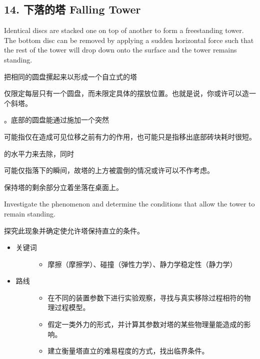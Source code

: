 \documentclass[a4paper,10pt,english]{sphinxmanual}
\begin{document}
\subsection{14. 下落的塔 Falling Tower}
\label{\detokenize{8. Appendix:falling-tower}}
Identical discs are stacked one on top of another to form a freestanding tower. The bottom disc can be removed by applying a sudden horizontal force such that the rest of the tower will drop down onto the surface and the tower remains standing.

把相同的圆盘摞起来以形成一个自立式的塔 %
\begin{footnote}[9]\sphinxAtStartFootnote
仅限定每层只有一个圆盘，而未限定具体的摆放位置。也就是说，你或许可以造一个斜塔。
%
\end{footnote} 。底部的圆盘能通过施加一个突然 %
\begin{footnote}[10]\sphinxAtStartFootnote
可能指仅在造成可见位移之前有力的作用，也可能只是指移出底部砖块耗时很短。
%
\end{footnote} 的水平力来去除，同时 %
\begin{footnote}[11]\sphinxAtStartFootnote
可能仅指落下的瞬间，故塔的上方被震倒的情况或许可以不作考虑。
%
\end{footnote} 保持塔的剩余部分立着坐落在桌面上。

Investigate the phenomenon and determine the conditions that allow the tower to remain standing.

探究此现象并确定使允许塔保持直立的条件。
\begin{itemize}
\item {} \begin{description}
\item[{关键词}] \leavevmode\begin{itemize}
\item {} 
摩擦（摩擦学）、碰撞（弹性力学）、静力学稳定性（静力学）

\end{itemize}

\end{description}

\item {} \begin{description}
\item[{路线}] \leavevmode\begin{itemize}
\item {} 
在不同的装置参数下进行实验观察，寻找与真实移除过程相符的物理过程模型。

\item {} 
假定一类外力的形式，并计算其参数对塔的某些物理量能造成的影响。

\item {} 
建立衡量塔直立的难易程度的方式，找出临界条件。

\end{itemize}

\end{description}

\end{itemize}
\end{document}
